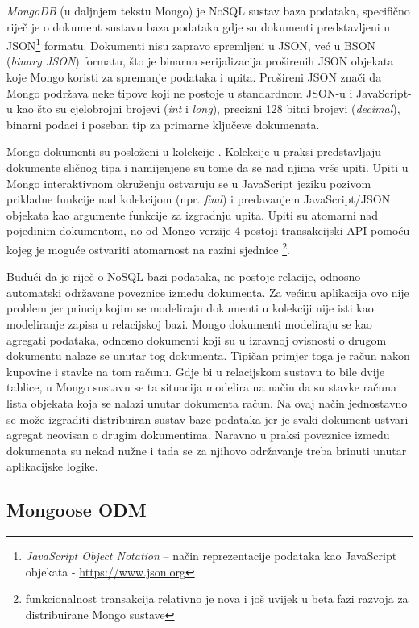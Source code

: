 \documentclass[times, utf8, diplomski, numeric]{fer}
\begin{document}
\emph{MongoDB} (u daljnjem tekstu Mongo) je NoSQL sustav baza podataka, specifično riječ je o dokument sustavu baza podataka gdje su dokumenti predstavljeni u JSON\footnote{
    \emph{JavaScript Object Notation} – način reprezentacije podataka kao JavaScript objekata - \url{https://www.json.org}
} formatu.
Dokumenti nisu zapravo spremljeni u JSON, već u BSON (\emph{binary JSON}) formatu, što je binarna serijalizacija proširenih JSON objekata koje Mongo koristi za spremanje podataka i upita.
Prošireni JSON znači da Mongo podržava neke tipove koji ne postoje u standardnom JSON-u i JavaScript-u kao što su cjelobrojni brojevi (\emph{int} i \emph{long}), precizni 128 bitni brojevi (\emph{decimal}), binarni podaci i poseban tip za primarne ključeve dokumenata.

Mongo dokumenti su posloženi u kolekcije .
Kolekcije u praksi predstavljaju dokumente sličnog tipa i namijenjene su tome da se nad njima vrše upiti.
Upiti u Mongo interaktivnom okruženju ostvaruju se u JavaScript jeziku pozivom prikladne funkcije nad kolekcijom (npr. \emph{find}) i predavanjem JavaScript/JSON objekata kao argumente funkcije za izgradnju upita. Upiti su atomarni  nad pojedinim dokumentom, no od Mongo verzije 4 postoji transakcijski API pomoću kojeg je moguće ostvariti atomarnost na razini sjednice \footnote{
    funkcionalnost transakcija relativno je nova i još uvijek u beta fazi razvoja za distribuirane Mongo sustave
}\citep{mongo}.

Budući da je riječ o NoSQL bazi podataka, ne postoje relacije, odnosno automatski održavane poveznice između dokumenta.
Za većinu aplikacija ovo nije problem jer princip kojim se modeliraju dokumenti u kolekciji nije isti kao modeliranje zapisa u relacijskoj bazi.
Mongo dokumenti modeliraju se kao agregati podataka, odnosno dokumenti koji su u izravnoj ovisnosti o drugom dokumentu nalaze se unutar tog dokumenta.
Tipičan primjer toga je račun nakon kupovine i stavke na tom računu.
Gdje bi u relacijskom sustavu to bile dvije tablice, u Mongo sustavu se ta situacija modelira na način da su stavke računa lista objekata koja se nalazi unutar dokumenta račun.
Na ovaj način jednostavno se može izgraditi distribuiran sustav baze podataka jer je svaki dokument ustvari agregat neovisan o drugim dokumentima.
Naravno u praksi poveznice između dokumenata su nekad nužne i tada se za njihovo održavanje treba brinuti unutar aplikacijske logike.


\subsection{Mongoose ODM}
\end{document}
